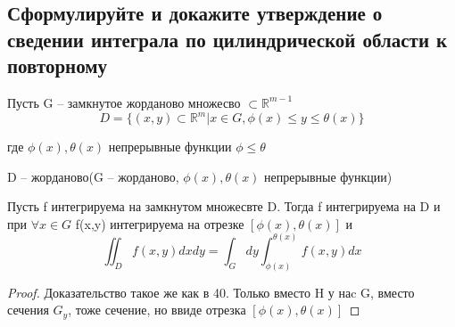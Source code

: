 
\subsection{Сформулируйте и докажите утверждение о сведении интеграла по цилиндрической области к повторному}
Пусть G -- замкнутое жорданово множесво $\subset \mathbb{R}^{m - 1}$
\[D = \{(x, y)\subset\mathbb{R}^{m}| x\in G, \phi(x)\leqslant y \leqslant \theta(x)\}\]

где $\phi(x), \theta(x)$ непрерывные функции $\phi\leqslant\theta$

D -- жорданово(G -- жорданово, $\phi(x), \theta(x)$ непрерывные функции)

\begin{theorem}
	Пусть f интегрируема на замкнутом множесвте D. Тогда f интегрируема на D и при $\forall x\in G$ f(x,y) интегрируема на отрезке $[\phi(x), \theta(x)]$ и
	\[\iint_D f(x,y)dxdy  = \int_{G} dy\int_{\phi(x)}^{\theta(x)}f(x, y)dx\]
\end{theorem}
\begin{proof}
	Доказательство такое же как в 40. Только вместо H у наc G, вместо сечения $G_y$, тоже сечение, но ввиде отрезка $[\phi(x), \theta(x)]$
\end{proof}

